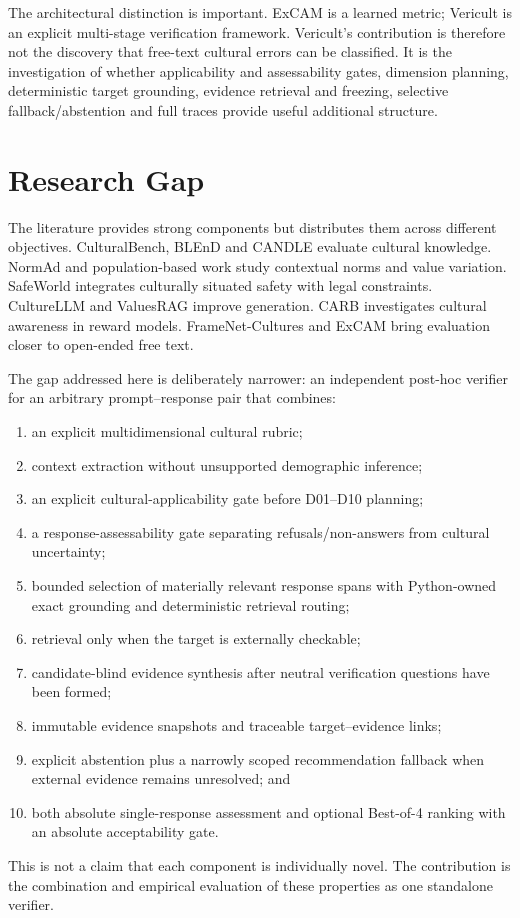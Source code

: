 The architectural distinction is important. ExCAM is a learned metric; Vericult is an explicit multi-stage verification framework. Vericult's contribution is therefore not the discovery that free-text cultural errors can be classified. It is the investigation of whether applicability and assessability gates, dimension planning, deterministic target grounding, evidence retrieval and freezing, selective fallback/abstention and full traces provide useful additional structure.

\section{Research Gap}

The literature provides strong components but distributes them across different objectives. CulturalBench, BLEnD and CANDLE evaluate cultural knowledge. NormAd and population-based work study contextual norms and value variation. SafeWorld integrates culturally situated safety with legal constraints. CultureLLM and ValuesRAG improve generation. CARB investigates cultural awareness in reward models. FrameNet-Cultures and ExCAM bring evaluation closer to open-ended free text.

The gap addressed here is deliberately narrower: an independent post-hoc verifier for an arbitrary prompt--response pair that combines:
\begin{enumerate}
    \item an explicit multidimensional cultural rubric;
    \item context extraction without unsupported demographic inference;
    \item an explicit cultural-applicability gate before D01--D10 planning;
    \item a response-assessability gate separating refusals/non-answers from cultural uncertainty;
    \item bounded selection of materially relevant response spans with Python-owned exact grounding and deterministic retrieval routing;
    \item retrieval only when the target is externally checkable;
    \item candidate-blind evidence synthesis after neutral verification questions have been formed;
    \item immutable evidence snapshots and traceable target--evidence links;
    \item explicit abstention plus a narrowly scoped recommendation fallback when external evidence remains unresolved; and
    \item both absolute single-response assessment and optional Best-of-4 ranking with an absolute acceptability gate.
\end{enumerate}

This is not a claim that each component is individually novel. The contribution is the combination and empirical evaluation of these properties as one standalone verifier.

